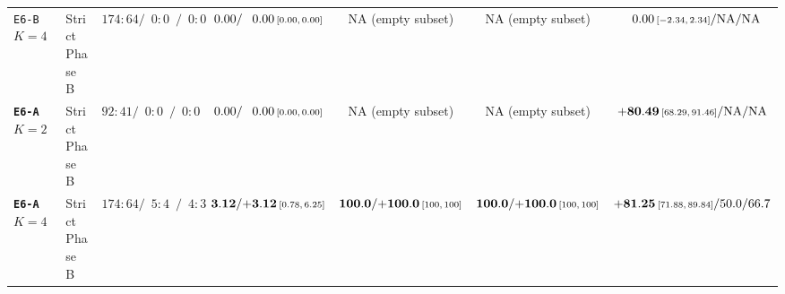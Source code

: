 \begin{table}[t]
{\begin{tabular}{l l c c c c c}
    \texttt{E6-B} $K{=}4$       & Strict Phase B & $174{:}64 / \phantom{0}0{:}0\phantom{0} / \phantom{0}0{:}0\phantom{0}$ & $0.00 / \phantom{+}0.00\ci{0.00}{0.00}$ & NA (empty subset) & NA (empty subset) & $\phantom{+}0.00\ci{-2.34}{2.34} / \text{NA} / \text{NA}$ \\
    \textbf{\texttt{E6-A}} $K{=}2$ & Strict Phase B & $92{:}41 / \phantom{0}0{:}0\phantom{0} / \phantom{0}0{:}0\phantom{0}$ & $0.00 / \phantom{+}0.00\ci{0.00}{0.00}$ & NA (empty subset) & NA (empty subset) & $\mathbf{+80.49}\ci{68.29}{91.46} / \text{NA} / \text{NA}$ \\
    \textbf{\texttt{E6-A}} $K{=}4$ & Strict Phase B & $174{:}64 / \phantom{0}5{:}4\phantom{0} / \phantom{0}4{:}3\phantom{0}$ & $\mathbf{3.12} / \mathbf{+3.12}\ci{0.78}{6.25}$ & $\mathbf{100.0} / \mathbf{+100.0}\ci{100}{100}$ & $\mathbf{100.0} / \mathbf{+100.0}\ci{100}{100}$ & $\mathbf{+81.25}\ci{71.88}{89.84} / 50.0 / 66.7$ \\
    \bottomrule
  \end{tabular}%
  }
\end{table}

